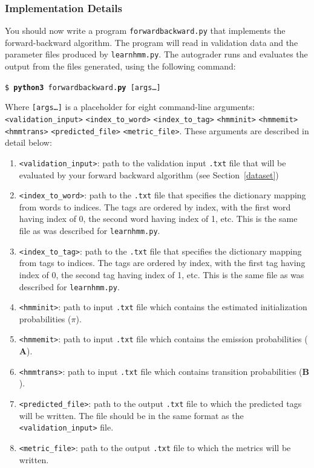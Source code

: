 \documentclass[11pt,addpoints,answers]{exam}
\begin{document}
\clearpage
\subsubsection{Implementation Details}

You should now write a program \texttt{forwardbackward.py} that implements the forward-backward algorithm. The program will read in validation data and the parameter files produced by \texttt{learnhmm.py}. The autograder runs and evaluates the output from the files generated, using the following command:

\begin{tabbing}
\=\texttt{\$ \textbf{python3} forwardbackward.\textbf{py} [args\dots]}\\
\end{tabbing}

Where \texttt{[args\dots]} is a placeholder for eight command-line arguments:\texttt{<validation\_input>} \texttt{<index\_to\_word>} \texttt{<index\_to\_tag>} \texttt{<hmminit>} \texttt{<hmmemit>} \texttt{<hmmtrans>} \texttt{<predicted\_file>} \texttt{<metric\_file>}. These arguments are described in detail below:
\begin{enumerate}
    \item \texttt{<validation\_input>}: path to the validation input \texttt{.txt} file that will be evaluated by your forward backward algorithm (see Section~\ref{dataset})
    \item \texttt{<index\_to\_word>}: path to the \texttt{.txt} file that specifies the dictionary mapping from words to indices. The tags are ordered by index, with the first word having index of 0, the second word having index of 1, etc. This is the same file as was described for \texttt{learnhmm.py}.
    \item \texttt{<index\_to\_tag>}: path to the \texttt{.txt} file that specifies the dictionary mapping from tags to indices. The tags are ordered by index, with the first tag having index of 0, the second tag having index of 1, etc. This is the same file as was described for \texttt{learnhmm.py}.
    \item \texttt{<hmminit>}: path to input \texttt{.txt} file which contains the estimated initialization probabilities (\boldmath${\pi}$).
    \item \texttt{<hmmemit>}: path to input \texttt{.txt} file which contains the emission probabilities ($\mathbf A$).
    \item \texttt{<hmmtrans>}: path to input \texttt{.txt} file which contains transition probabilities ($\mathbf B$).
    \item \texttt{<predicted\_file>}: path to the output \texttt{.txt} file to which the predicted tags will be written. The file should be in the same format as the \texttt{<validation\_input>} file. 
    \item \texttt{<metric\_file>}: path to the output \texttt{.txt} file to which the metrics will be written. 
\end{enumerate}
\end{document}
